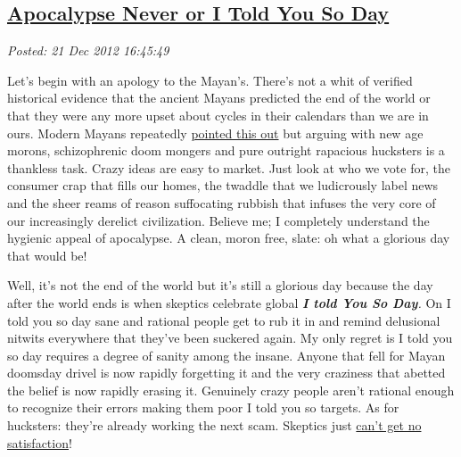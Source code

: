 %

\subsection*{\href{http://bakerjd99.wordpress.com/2012/12/21/apocalypse-never-or-i-told-you-so-day/}{Apocalypse Never or I Told You So Day}}


\noindent\emph{Posted: 21 Dec 2012 16:45:49}
\vspace{6pt}

Let's begin with an apology to the Mayan's. There's not a whit of
verified historical evidence that the ancient Mayans predicted the end
of the world or that they were any more upset about cycles in their
calendars than we are in ours. Modern Mayans repeatedly
\href{http://boingboing.net/2009/10/13/what-actual-mayans-a.html}{pointed
this out} but arguing with new age morons, schizophrenic doom mongers
and pure outright rapacious hucksters is a thankless task. Crazy ideas
are easy to market. Just look at who we vote for, the consumer crap that
fills our homes, the twaddle that we ludicrously label news and the
sheer reams of reason suffocating rubbish that infuses the very core of
our increasingly derelict civilization. Believe me; I completely
understand the hygienic appeal of apocalypse. A clean, moron free,
slate: oh what a glorious day that would be!

Well, it's not the end of the world but it's still a glorious day
because the day after the world ends is when skeptics celebrate global
\emph{\textbf{I told You So Day}.} On I told you so day sane and
rational people get to rub it in and remind delusional nitwits
everywhere that they've been suckered again. My only regret is I told
you so day requires a degree of sanity among the insane. Anyone that
fell for Mayan doomsday drivel is now rapidly forgetting it and the very
craziness that abetted the belief is now rapidly erasing it. Genuinely
crazy people aren't rational enough to recognize their errors making
them poor I told you so targets. As for hucksters: they're already
working the next scam. Skeptics just
\href{http://www.youtube.com/watch?v=Lx0bLBk-BNM}{can't get no
satisfaction}!



